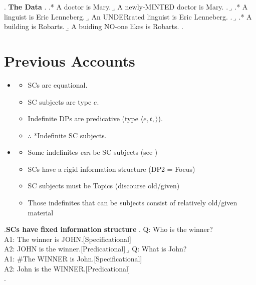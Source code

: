 \documentclass[GPFinal]{subfiles}
\begin{document}
\ex. \textbf{The Data}
\a.
\a.* A doctor is Mary.
\b. A newly-MINTED doctor is Mary.
\z.
\b.
\a.* A linguist is Eric Lenneberg.
\b. An UNDERrated linguist is Eric Lenneberg.
\z.
\b.
\a.* A building is Robarts.
\b. A buiding NO-one likes is Robarts.
\z.

\section{Previous Accounts}
\begin{itemize}
  \item \textcite{heycockkroch1999pseudocleft}
    \begin{itemize}
      \item SCs are equational.
      \item SC subjects are type $e$.
      \item Indefinite DPs are predicative (type $\langle e,t,\rangle$).
      \item $\therefore$ *Indefinite SC subjects.
    \end{itemize}
  \item \textcite{mikkelsen2004specifying}
    \begin{itemize}
      \item Some indefinites \textit{can} be SC subjects (see \Last)
      \item SCs have a rigid information structure (DP2 = Focus)
    \end{itemize}
    \begin{itemize}
      \item SC subjects must be Topics (discourse old/given)
      \item Those indefinites that can be subjects consist of relatively old/given material
    \end{itemize}
\end{itemize}
\ex.\textbf{SCs have fixed information structure}
\a. Q: Who is the winner?\\
A1: The winner is JOHN.\hfill[Specificational]\\
A2: JOHN is the winner.\hfill[Predicational]
\b. Q: What is John?\\
A1: \#The WINNER is John.\hfill[Specificational]\\
A2: John is the WINNER.\hfill[Predicational]\\
\z.
\end{document}

